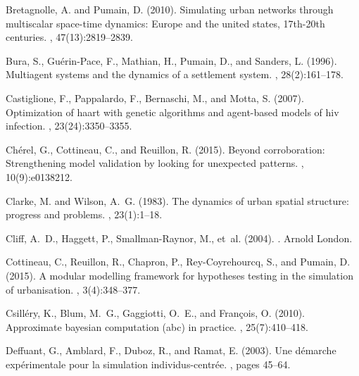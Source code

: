 \documentclass[10pt]{article}
\begin{document}
\begin{thebibliography}{}
Bretagnolle, A. and Pumain, D. (2010).
\newblock Simulating urban networks through multiscalar space-time dynamics:
  Europe and the united states, 17th-20th centuries.
, 47(13):2819--2839.

Bura, S., Gu{\'e}rin-Pace, F., Mathian, H., Pumain, D., and Sanders, L. (1996).
\newblock Multiagent systems and the dynamics of a settlement system.
, 28(2):161--178.

Castiglione, F., Pappalardo, F., Bernaschi, M., and Motta, S. (2007).
\newblock Optimization of haart with genetic algorithms and agent-based models
  of hiv infection.
, 23(24):3350--3355.

Ch{\'e}rel, G., Cottineau, C., and Reuillon, R. (2015).
\newblock Beyond corroboration: Strengthening model validation by looking for
  unexpected patterns.
, 10(9):e0138212.

Clarke, M. and Wilson, A.~G. (1983).
\newblock The dynamics of urban spatial structure: progress and problems.
, 23(1):1--18.

Cliff, A.~D., Haggett, P., Smallman-Raynor, M., et~al. (2004).
.
\newblock Arnold London.

Cottineau, C., Reuillon, R., Chapron, P., Rey-Coyrehourcq, S., and Pumain, D.
  (2015).
\newblock A modular modelling framework for hypotheses testing in the
  simulation of urbanisation.
, 3(4):348--377.

Csill{\'e}ry, K., Blum, M.~G., Gaggiotti, O.~E., and Fran{\c{c}}ois, O. (2010).
\newblock Approximate bayesian computation (abc) in practice.
, 25(7):410--418.

Deffuant, G., Amblard, F., Duboz, R., and Ramat, E. (2003).
\newblock Une d{\'e}marche exp{\'e}rimentale pour la simulation
  individus-centr{\'e}e.
, pages 45--64.


\end{thebibliography}
\end{document}
